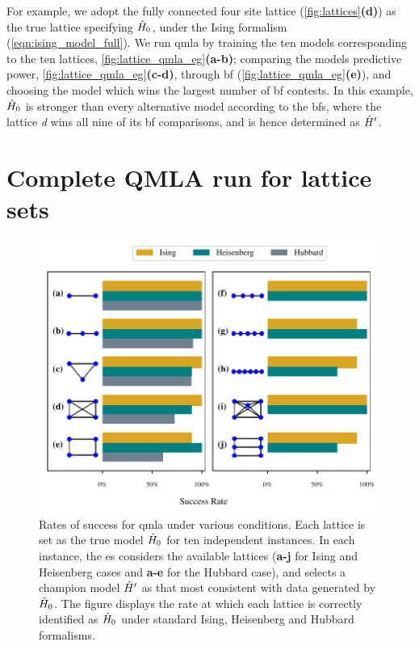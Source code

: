For example, we adopt the fully connected four site lattice (\cref{fig:lattices}\textbf{(d)})
    as the true lattice specifying $\hat{H}_0$, under the Ising formalism (\cref{eqn:ising_model_full}).
We run \gls{qmla} by training the ten models corresponding to the ten lattices,  \cref{fig:lattice_qmla_eg}\textbf{(a-b)};
    comparing the models predictive power, \cref{fig:lattice_qmla_eg}\textbf{(c-d)},
    through \gls{bf} (\cref{fig:lattice_qmla_eg}\textbf{(e)}), 
    and choosing the model which wins the largest number of \gls{bf} contests. 
In this example, $\hat{H}_0$ is stronger than every alternative model according to the \glspl{bf},
    where the lattice \emph{d} wins all nine of its \gls{bf} comparisons, 
    and is hence determined as $\hat{H}^{\prime}$. 

\section{Complete QMLA run for lattice sets}
\begin{figure}
    \begin{center}
        \includegraphics{theoretical_study/figures/lattice_successes_two_column.pdf}
    \end{center}
    \caption[QMLA success rates for lattices]{
        Rates of success for \gls{qmla} under various conditions. 
        Each lattice is set as the \gls{true model} $\hat{H}_0$ for ten independent instances. 
        In each instance, the \gls{es} considers the available lattices 
            (\textbf{a-j} for Ising and Heisenberg cases and \textbf{a-e} for the Hubbard case), 
            and selects a \gls{champion model} $\hat{H}^{\prime}$ as that most consistent with data generated by $\hat{H}_0$. 
        The figure displays the rate at which each lattice is correctly identified as $\hat{H}_0$
            under standard Ising, Heisenberg and Hubbard formalisms. 
        \figtableref
    }
    \label{fig:lattice_success_rates}
\end{figure}

